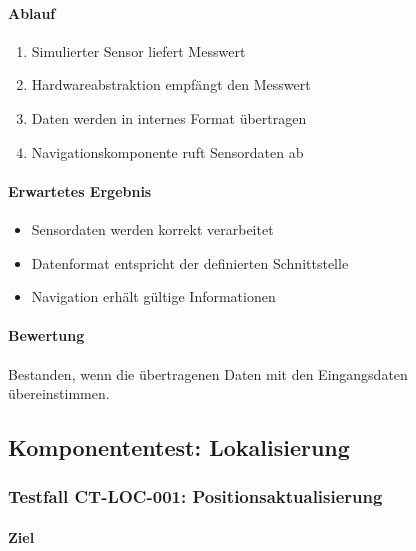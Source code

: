 \paragraph{Ablauf}\label{ablauf}

\begin{enumerate}
\def\labelenumi{\arabic{enumi}.}
\tightlist
\item
  Simulierter Sensor liefert Messwert
\item
  Hardwareabstraktion empfängt den Messwert
\item
  Daten werden in internes Format übertragen
\item
  Navigationskomponente ruft Sensordaten ab
\end{enumerate}

\paragraph{Erwartetes Ergebnis}\label{erwartetes-ergebnis}

\begin{itemize}
\tightlist
\item
  Sensordaten werden korrekt verarbeitet
\item
  Datenformat entspricht der definierten Schnittstelle
\item
  Navigation erhält gültige Informationen
\end{itemize}

\paragraph{Bewertung}\label{bewertung}

Bestanden, wenn die übertragenen Daten mit den Eingangsdaten
übereinstimmen.

\subsection{Komponententest:
Lokalisierung}\label{komponententest-lokalisierung}

\subsubsection{Testfall CT-LOC-001:
Positionsaktualisierung}\label{testfall-ct-loc-001-positionsaktualisierung}

\paragraph{Ziel}\label{ziel-1}

